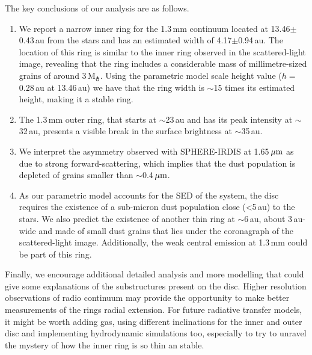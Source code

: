 \documentclass[letters,usenatbib,times]{mnras}
\begin{document}
The key conclusions of our analysis are as follows.
\begin{enumerate}

  \item We report a narrow inner ring for the 1.3\,mm continuum located at 13.46$\pm$0.43\,au from the stars and has an estimated width of 4.17$\pm$0.94\,au. The location of this ring is similar to the inner ring observed in the scattered-light image, revealing that the ring includes a considerable mass of millimetre-sized grains of around 3\,M$_{\earth}$. Using the parametric model scale height value ($h= $ 0.28\,au at 13.46\,au) we have that the ring width is $\sim$15 times its estimated height, making it a stable ring.
  
  \item The 1.3\,mm outer ring, that starts at $\sim$23\,au and has its peak intensity at $\sim$32\,au, presents a visible break in the surface brightness at $\sim$35\,au. 
  
  
  \item We interpret the asymmetry observed with SPHERE-IRDIS at 1.65\,$\hbox{$\mu$m}$ as due to strong forward-scattering, which implies that the dust population is depleted of grains smaller than $\sim$0.4\,$\hbox{$\mu$m}$.
  
  \item As our parametric model accounts for the SED of the system, the disc requires the existence of a sub-micron dust population close (<5\,au) to the stars. We also predict the existence of another thin ring at $\sim$6\,au, about 3\,au-wide and made of small dust grains that lies under the coronagraph of the scattered-light image. Additionally, the weak central emission at 1.3\,mm could be part of this ring.
\end{enumerate}
  
Finally, we encourage additional detailed analysis and more modelling that could give some explanations of the substructures present on the disc. Higher resolution observations of radio continuum may provide the opportunity to make better measurements of the rings radial extension. For future radiative transfer models, it might be worth adding gas, using different inclinations for the inner and outer disc and implementing hydrodynamic simulations too, especially to try to unravel the mystery of how the inner ring is so thin an stable. 
\end{document}
